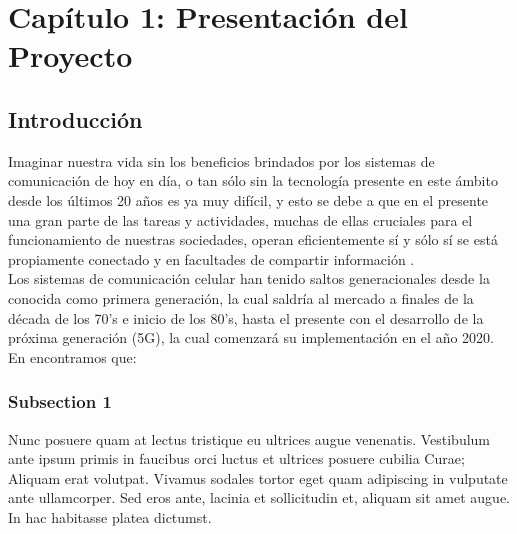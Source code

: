 
\chapter{Capítulo 1: Presentación del Proyecto} %

\label{Chapter1} %


\section{Introducción}

Imaginar nuestra vida sin los beneficios brindados por los sistemas de comunicación de hoy en día, o tan sólo sin la tecnología presente en este ámbito desde los últimos 20 años es ya muy difícil, y esto se debe a que en el presente una gran parte de las tareas y actividades, muchas de ellas cruciales para el funcionamiento de nuestras sociedades, operan eficientemente sí y sólo sí se está propiamente conectado y en facultades de compartir información \parencite{Fettweis2014}.\\
Los sistemas de comunicación celular han tenido saltos generacionales desde la conocida como primera generación, la cual saldría al mercado a finales de la década de los 70’s e inicio de los 80’s, hasta el presente con el desarrollo de la próxima generación (5G), la cual comenzará su implementación en el año 2020. En \parencite{Fettweis2014} encontramos que:

\subsection{Subsection 1}

Nunc posuere quam at lectus tristique eu ultrices augue venenatis. Vestibulum ante ipsum primis in faucibus orci luctus et ultrices posuere cubilia Curae; Aliquam erat volutpat. Vivamus sodales tortor eget quam adipiscing in vulputate ante ullamcorper. Sed eros ante, lacinia et sollicitudin et, aliquam sit amet augue. In hac habitasse platea dictumst.


